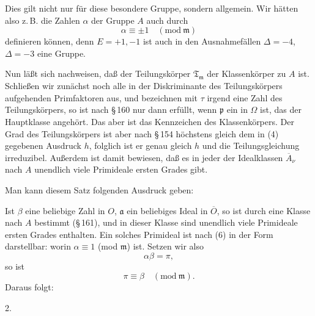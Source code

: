 
Dies gilt nicht nur für diese besondere Gruppe, sondern allgemein. Wir hätten also z.\,B. die Zahlen $\alpha$ der Gruppe $A$ auch durch
\[
\alpha \equiv \pm 1 \quad (\mathrm{mod}\ \mathfrak{m})
\]
definieren können, denn $E = +1, -1$ ist auch in den Ausnahmefällen $\Delta = -4$, $\Delta = -3$ eine Gruppe.

Nun läßt sich nachweisen, daß der Teilungskörper $\mathfrak{T}_{\mathfrak{m}}$ der Klassenkörper zu $A$ ist. Schließen wir zunächst noch alle in der Diskriminante des Teilungskörpers aufgehenden Primfaktoren aus, und bezeichnen mit $\tau$ irgend eine Zahl des Teilungskörpers, so ist nach \S\,160
nur dann erfüllt, wenn $\mathfrak{p}$ ein  in $\Omega$ ist, das der Hauptklasse angehört. Das aber ist das Kennzeichen des Klassenkörpers. Der Grad des Teilungskörpers ist aber nach \S\,154 höchstens gleich dem in (4) gegebenen Ausdruck $h$, folglich ist er genau gleich $h$ und die Teilungsgleichung irreduzibel. Außerdem ist damit bewiesen, daß es in jeder der Idealklassen $\overline{A}_\nu$ nach $A$ unendlich viele Primideale ersten Grades gibt.

Man kann diesem Satz folgenden Ausdruck geben:

Ist $\beta$ eine beliebige Zahl in $O$, $\mathfrak{a}$ ein beliebiges Ideal in $\overline{O}$, so ist durch
eine Klasse nach $A$ bestimmt (\S\,161), und in dieser Klasse sind unendlich viele Primideale ersten Grades enthalten. Ein solches Primideal ist nach (6) in der Form darstellbar:
worin $\alpha \equiv 1$ (mod $\mathfrak{m}$) ist. Setzen wir also
\[
\alpha\beta = \pi,
\]
so ist
\[
\pi \equiv \beta \quad (\mathrm{mod}\ \mathfrak{m}).
\]
Daraus folgt:

2. 

